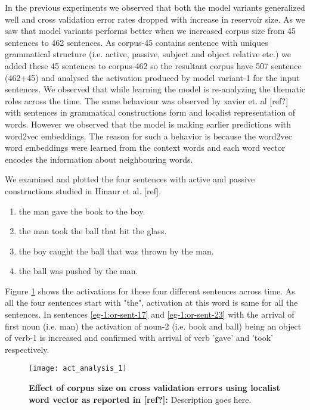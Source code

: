 In the previous experiments we observed that both the model variants generalized well and cross validation error rates dropped with increase in reservoir size. As we saw that model variants performs better when we increased corpus size from 45 sentences to 462 sentences. As corpus-45 contains sentence with uniques grammatical structure (i.e. active, passive, subject and object relative etc.) we added these 45 sentences to corpus-462 so the resultant corpus have 507 sentence (462+45) and analysed the activation produced by model variant-1 for the input sentences. We observed that while learning the model is re-analyzing the thematic roles across the time. The same behaviour was observed by xavier et. al [ref?] with sentences in grammatical constructions form and localist representation of words. However we observed that the model is making earlier predictions with word2vec embeddings. The reason for such a behavior is because the word2vec word embeddings were learned from the context words and each word vector encodes the information about neighbouring words. 

We examined and plotted the four sentences with active and passive constructions studied in Hinaur et al. [ref].

\begin{enumerate}[noitemsep]
\item the man gave the book to the boy. \label{eg-1:or-sent-17}
\item the man took the ball that hit the glass. \label{eg-1:or-sent-23}
\item the boy caught the ball that was thrown by the man.  \label{eg-1:or-sent-27} 
\item the ball was pushed by the man.  \label{eg-1:or-sent-16}
\end{enumerate}

Figure \ref{fig:act_analysis_1} shows the activations for these four different sentences across time. As all the four sentences start with "the", activation at this word is same for all the sentences. In sentences \ref{eg-1:or-sent-17} and \ref{eg-1:or-sent-23} with the arrival of first noun (i.e. man) the activation of noun-2 (i.e. book and ball) being an object of verb-1 is increased and confirmed with arrival of verb 'gave' and 'took' respectively.

\begin{figure}[hbtp]
\centering
\texttt{[image: act\_analysis\_1]}
\caption{\textbf{Effect of corpus size on cross validation errors using localist word vector as reported in [ref?]:} Description goes here.}
\label{fig:act_analysis_1}
\end{figure}

